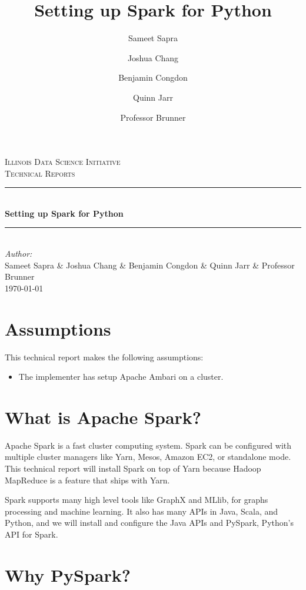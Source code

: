 \documentclass[9pt,twocolumn,twoside]{idsi}
\author[1]{Sameet Sapra}
\author[2]{Joshua Chang}
\author[3]{Benjamin Congdon}
\author[4]{Quinn Jarr}
\author[5]{Professor Brunner}
\title{Setting up Spark for Python}
\newcommand{\HRule}{\rule{\linewidth}{0.5mm}}
\begin{document}
\begin{titlepage}
\center 
\textsc{\LARGE Illinois Data Science Initiative}\\[1.5cm] 
\textsc{\Large Technical Reports}\\[0.5cm] \HRule \\[0.4cm]
{\huge \bfseries Setting up Spark for Python } \\[0.4cm] \HRule \\[1.5cm]
\Large \emph{Author:}\\ Sameet Sapra \& Joshua Chang \& Benjamin Congdon \& Quinn Jarr \& Professor Brunner\\[3cm]
{\large \today}\\[3cm] %
\vfill
\end{titlepage}

\maketitle

\section{Assumptions}

This technical report makes the following assumptions:
\begin{itemize}
\item The implementer has setup Apache Ambari on a cluster.
\end{itemize}

\section{What is Apache Spark?}

Apache Spark is a fast cluster computing system. Spark can be configured with multiple cluster managers like Yarn, Mesos, Amazon EC2, or standalone mode. This technical report will install Spark on top of Yarn because Hadoop MapReduce is a feature that ships with Yarn.

Spark supports many high level tools like GraphX and MLlib, for graphs processing and machine learning. It also has many APIs in Java, Scala, and Python, and we will install and configure the Java APIs and PySpark, Python's API for Spark.

\section{Why PySpark?}
\end{document}

